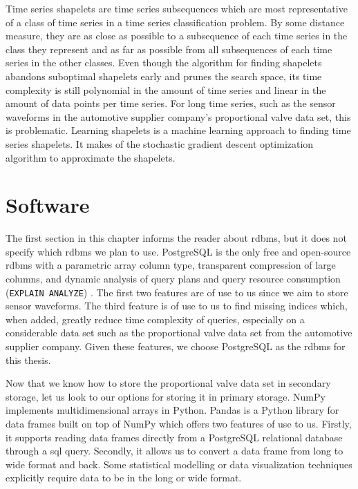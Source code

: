 Time series shapelets \citep{DBLP:conf/kdd/YeK09} are time series subsequences which are most representative of a class of time series in a time series classification problem.
By some distance measure, they are as close as possible to a subsequence of each time series in the class they represent and as far as possible from all subsequences of each time series in the other classes.
Even though the algorithm for finding shapelets abandons suboptimal shapelets early and prunes the search space, its time complexity is still polynomial in the amount of time series and linear in the amount of data points per time series.
For long time series, such as the sensor waveforms in the automotive supplier company's proportional valve data set, this is problematic.
Learning shapelets \citep{DBLP:conf/kdd/GrabockaSWS14} is a machine learning approach to finding time series shapelets.
It makes of the stochastic gradient descent optimization algorithm to approximate the shapelets.

\section{Software}

The first section in this chapter informs the reader about \acrshort{rdbms}, but it does not specify which \acrshort{rdbms} we plan to use.
PostgreSQL is the only free and open-source \acrshort{rdbms} with a parametric array column type, transparent compression of large columns, and dynamic analysis of query plans and query resource consumption (\texttt{EXPLAIN ANALYZE}) \citep{postgresql}.
The first two features are of use to us since we aim to store sensor waveforms.
The third feature is of use to us to find missing indices which, when added, greatly reduce time complexity of queries, especially on a considerable data set such as the proportional valve data set from the automotive supplier company.
Given these features, we choose PostgreSQL as the \acrshort{rdbms} for this thesis.

Now that we know how to store the proportional valve data set in secondary storage, let us look to our options for storing it in primary storage.
NumPy \citep{DBLP:journals/cse/WaltCV11} implements multidimensional arrays in Python.
Pandas \citep{DBLP:journals/usenix-login/Beazley12e} is a Python library for data frames built on top of NumPy which offers two features of use to us.
Firstly, it supports reading data frames directly from a PostgreSQL relational database through a \acrshort{sql} query.
Secondly, it allows us to convert a data frame from long to wide format and back.
Some statistical modelling or data visualization techniques explicitly require data to be in the long or wide format.

